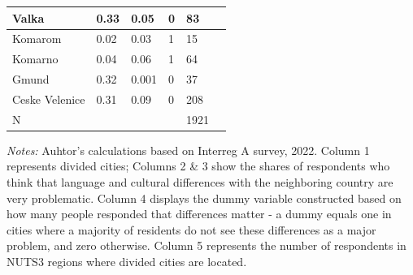\documentclass[12pt]{article}    %
\begin{document}
\begin{table}[H]
\begin{tabular}{llllll}
Valka                & 0.33                         & 0.05                         & 0                      & 83                   &                          \\
\hline
Komarom    & 0.02                         & 0.03                         & 1                      & 15                   &                          \\
Komarno   & 0.04                         & 0.06                         & 1                      & 64                   &                          \\
\hline
Gmund                & 0.32                         & 0.001                        & 0                      & 37                   &                          \\
Ceske Velenice       & 0.31                         & 0.09                         & 0                      & 208                  &                          \\
\hline
\hline 
N                    &                              &                              &                        & 1921                 &                        
\\
\end{tabular}
\end{table}
\vspace{0.3cm}
\footnotesize {\textit{Notes:} Auhtor’s calculations based on Interreg A survey, 2022. Column 1 represents divided cities; Columns 2 \& 3 show the shares of respondents who think that language and cultural differences with the neighboring country are very problematic. Column 4 displays the dummy variable constructed based on how many people responded that differences matter - a dummy equals one in cities where a majority of residents do not see these differences as a major problem, and zero otherwise. Column 5 represents the number of respondents in NUTS3 regions where divided cities are located.}

\newpage
\setcounter{secnumdepth}{0} 


\end{document}
